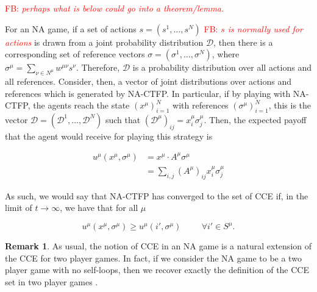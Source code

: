 \documentclass{article}
\theoremstyle{definition}
\newtheorem*{remark}{Remark}
\newcommand{\fb}[1]{\textcolor{red}{FB: \textit{#1}}}
\newcommand{\wmunu}{w^{\mu \nu}}
\newcommand{\xmu}{x^{\mu}}
\newcommand{\refmu}{\sigma^{\mu}}
\begin{document}
  \fb{perhaps what is below could go into a theorem/lemma.}
  
  For an NA game, if a set of actions $s = (s^1, \ldots, s^N)$ \fb{$s$ is normally used for actions} is
  drawn from a joint probability distribution $\mathcal{D}$, then
  there is a corresponding set of reference vectors $\sigma =
  (\sigma^1, \ldots, \sigma^N)$, where $\sigma^\mu = \sum_{\nu \in
    N^\mu} \wmunu s^\nu$.  Therefore, $\mathcal{D}$ is a probability
  distribution over all actions and all references.  Consider, then, a
  vector of joint distributions over actions and references which is
  generated by NA-CTFP. In particular, if by playing with NA-CTFP, the
  agents reach the state $(\xmu)_{i = 1}^N$ with references
  $(\refmu)_{i = 1}^N$, this is the vector $\mathcal{D} =
  (\mathcal{D}^1, ..., \mathcal{D}^N)$ such that
  $(\mathcal{D}^\mu)_{ij} = \xmu_i \refmu_j$. Then, the expected
  payoff that the agent would receive for playing this strategy is

  \begin{align}
    u^\mu(\xmu, \refmu) & = \xmu \cdot A^\mu \refmu \nonumber \\
    & = \sum_{i, j} (A^\mu)_{ij} \xmu_i \refmu_j \nonumber 
  \end{align}

  As such, we would say that NA-CTFP has converged to the set of CCE if, in the limit of $t
  \rightarrow \infty$, we have that for all $\mu$

  \begin{equation}
    u^\mu (\xmu, \refmu) \geq u^\mu(i', \refmu) \hspace{1cm} \forall i' \in S^\mu.
  \end{equation}

  \begin{remark}
    As usual, the notion of CCE in an NA game is a natural extension of the CCE for two player
    games. In fact, if we consider the NA game to be a two player game with no self-loops, then
    we recover exactly the definition of the CCE set in two player games \cite{PayoffPerformance}.
  \end{remark}
\end{document}
